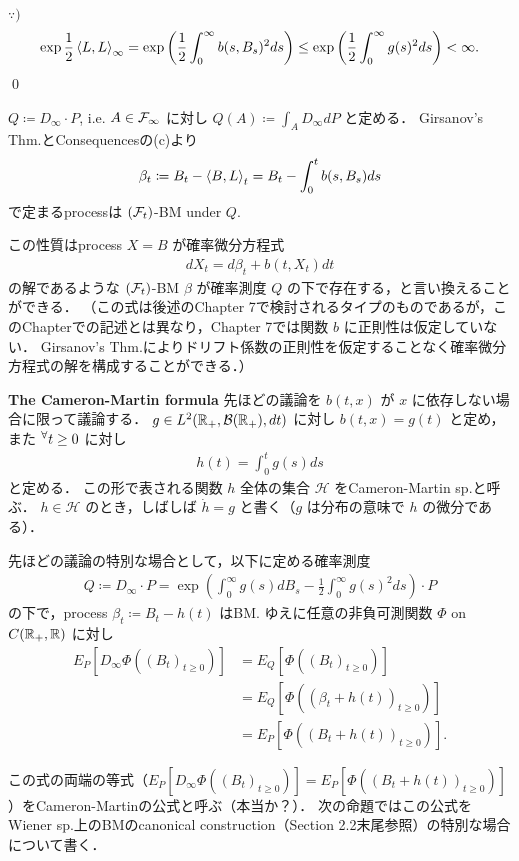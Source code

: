 \documentclass{jsarticle}
\begin{document}
$\because)$
\begin{align}
    \exp\frac{1}{2}\left\langle L,L\right\rangle_\infty
    = \exp\left(\frac{1}{2}\int_0^\infty b(s,B_s)^2 ds\right)
    \le \exp\left(\frac{1}{2}\int_0^\infty g(s)^2 ds\right)
    < \infty.
\end{align}\qed

$Q\coloneqq D_\infty\cdot P$, i.e. $A\in\mathcal{F}_\infty$ に対し $Q(A)\coloneqq\int_A D_\infty dP$ と定める．
Girsanov's Thm.とConsequencesの(c)より
\begin{align}
    \beta_t
    \coloneqq B_t-\left\langle B,L\right\rangle_t
    = B_t-\int_0^t b(s,B_s)ds
\end{align}
で定まるprocessは $(\mathcal{F}_t)$-BM under $Q.$

この性質はprocess $X=B$ が確率微分方程式
\begin{align}
    dX_t=d\beta_t+b(t,X_t)dt
\end{align}
の解であるような $(\mathcal{F}_t)$-BM $\beta$ が確率測度 $Q$ の下で存在する，と言い換えることができる．
（この式は後述のChapter 7で検討されるタイプのものであるが，このChapterでの記述とは異なり，Chapter 7では関数 $b$ に正則性は仮定していない．
Girsanov's Thm.によりドリフト係数の正則性を仮定することなく確率微分方程式の解を構成することができる．）

\textbf{The Cameron-Martin formula}
先ほどの議論を $b(t,x)$ が $x$ に依存しない場合に限って議論する．
$g\in L^2(\mathbb{R}_+,\mathcal{B}(\mathbb{R}_+),dt)$ に対し $b(t,x)=g(t)$ と定め，また ${}^{\forall} t\ge0$ に対し
\begin{align}
    h(t)=\int_{0}^{t}g(s)ds
\end{align}
と定める．
この形で表される関数 $h$ 全体の集合 $\mathcal{H}$ をCameron-Martin sp.と呼ぶ．
$h\in\mathcal{H}$ のとき，しばしば $\dot{h}=g$ と書く（$g$ は分布の意味で $h$ の微分である）．

先ほどの議論の特別な場合として，以下に定める確率測度
\begin{align}
    Q
    \coloneqq D_\infty\cdot P
    = \exp\left(\int_0^\infty g(s)dB_s-\frac{1}{2}\int_0^\infty g(s)^2 ds\right)\cdot P
\end{align}
の下で，process $\beta_t\coloneqq B_t-h(t)$ はBM.
ゆえに任意の非負可測関数 $\Phi$ on $C(\mathbb{R}_+,\mathbb{R})$ に対し
\begin{align}
    E_P[D_\infty\Phi((B_t)_{t\ge0})]
    &= E_Q[\Phi((B_t)_{t\ge0})] \\
    &= E_Q[\Phi((\beta_t+h(t))_{t\ge0})] \\
    &= E_P[\Phi((B_t+h(t))_{t\ge0})].
\end{align}

この式の両端の等式（$E_P[D_\infty\Phi((B_t)_{t\ge0})]=E_P[\Phi((B_t+h(t))_{t\ge0})]$）をCameron-Martinの公式と呼ぶ（本当か？）．
次の命題ではこの公式をWiener sp.上のBMのcanonical construction（Section 2.2末尾参照）の特別な場合について書く．
\end{document}
